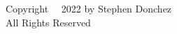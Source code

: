 \thispagestyle{plain}
\setcounter{page}{2}

\begingroup
\centering
\null
\vfill
Copyright ~{\sffamily\textcopyright}~2022 by Stephen Donchez
\\[0.5em]
All Rights Reserved
\vfill
\par
\endgroup
\clearpage